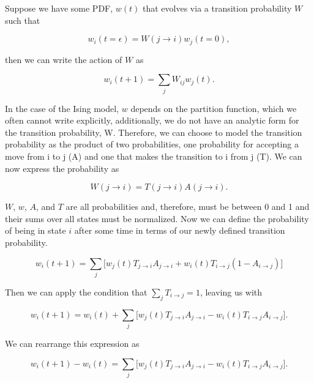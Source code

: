 \documentclass[%
oneside,                 %
final,                   %
10pt]{article}
\begin{document}
Suppose we have some PDF, $w(t)$ that evolves via a transition probability $W$ such that 

\begin{equation*}
w_i(t=\epsilon)=W(j \rightarrow i) w_j(t=0),
\end{equation*}

then we can write the action of $W$ as 

\begin{equation*}
w_i(t+1) = \sum_j W_{ij}w_j(t).
\end{equation*}

In the case of the Ising model, $w$ depends on the partition function, which we often cannot write explicitly, additionally, we do not have an analytic form for the transition probability, W.  Therefore, we can choose to model the transition probability as the product of two probabilities, one probability for accepting a move from i to j (A) and one that makes the transition to i from j (T).  We can now express the probability as

\begin{equation*}
W(j \rightarrow i) = T( j \rightarrow i) A(j \rightarrow i).
\end{equation*}

$W$, $w$, $A$, and $T$ are all probabilities and, therefore, must be between 0 and 1 and their sums over all states must be normalized.  Now we can define the probability of being in state $i$ after some time in terms of our newly defined transition probability.

\begin{equation*}
w_i(t+1)=\sum_j \lbrack w_j(t)T_{j \rightarrow i}A_{j \rightarrow i} + w_i(t)T_{i \rightarrow j} (1-A_{i \rightarrow j}) \rbrack
\end{equation*}

Then we can apply the condition that $\sum_j T_{i \rightarrow j}=1$, leaving us with

\begin{equation*}
w_i(t+1)= w_i(t) +\sum_j \lbrack w_j(t)T_{j \rightarrow i}A_{j \rightarrow i} - w_i(t)T_{i \rightarrow j}A_{i \rightarrow j} \rbrack.
\end{equation*}

We can rearrange this expression as

\begin{equation*}
w_i(t+1)- w_i(t) = \sum_j \lbrack w_j(t)T_{j \rightarrow i}A_{j \rightarrow i} - w_i(t)T_{i \rightarrow j}A_{i \rightarrow j} \rbrack.
\end{equation*}
\end{document}
